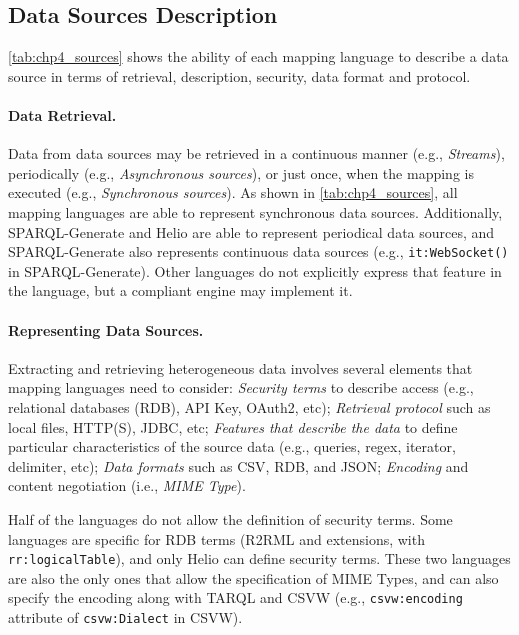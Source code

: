 \subsection{Data Sources Description}


\cref{tab:chp4_sources} shows the ability of each mapping language to describe a data source in terms of retrieval, description, security, data format and protocol. 


\noindent\paragraph{\textbf{Data Retrieval.}} Data from data sources may be retrieved in a continuous manner (e.g., \textit{Streams}),  periodically (e.g., \textit{Asynchronous sources}), or just once, when the mapping is executed (e.g., \textit{Synchronous sources}). As shown in \cref{tab:chp4_sources}, all mapping languages are able to represent synchronous data sources. Additionally, SPARQL-Generate and Helio are able to represent periodical data sources, and SPARQL-Generate also represents continuous data sources (e.g., \texttt{it:WebSocket()} in SPARQL-Generate). Other languages do not explicitly express that feature in the language, but a compliant engine may implement it.

\noindent\paragraph{\textbf{Representing Data Sources.}} Extracting and retrieving heterogeneous data involves several elements that mapping languages need to consider: \textit{Security terms} to describe access (e.g., relational databases (RDB), API Key, OAuth2, etc); \textit{Retrieval protocol} such as local files, HTTP(S), JDBC, etc; \textit{Features that describe the data} to define particular characteristics of the source data (e.g., queries, regex, iterator, delimiter, etc); \textit{Data formats} such as CSV, RDB, and JSON; \textit{Encoding} and content negotiation (i.e., \textit{MIME Type}). 

Half of the languages do not allow the definition of security terms. Some languages are specific for RDB terms (R2RML and extensions, with \texttt{rr:logical\-Table}), and only Helio can define security terms. These two languages are also the only ones that allow the specification of MIME Types, and can also specify the encoding along with TARQL and CSVW (e.g., \texttt{csvw:encoding} attribute of \texttt{csvw:Dialect} in CSVW). 

